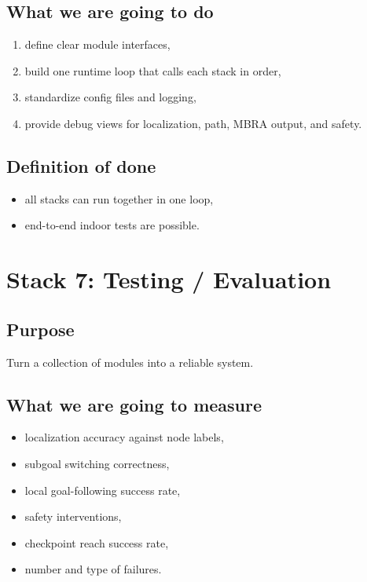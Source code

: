 \documentclass[11pt,a4paper]{article}
\begin{document}
\subsection{What we are going to do}

\begin{enumerate}[nosep]
  \item define clear module interfaces,
  \item build one runtime loop that calls each stack in order,
  \item standardize config files and logging,
  \item provide debug views for localization, path, MBRA output, and safety.
\end{enumerate}

\subsection{Definition of done}

\begin{itemize}[nosep]
  \item all stacks can run together in one loop,
  \item end-to-end indoor tests are possible.
\end{itemize}


\section{Stack 7: Testing / Evaluation}

\subsection{Purpose}

Turn a collection of modules into a reliable system.

\subsection{What we are going to measure}

\begin{itemize}[nosep]
  \item localization accuracy against node labels,
  \item subgoal switching correctness,
  \item local goal-following success rate,
  \item safety interventions,
  \item checkpoint reach success rate,
  \item number and type of failures.
\end{itemize}
\end{document}

